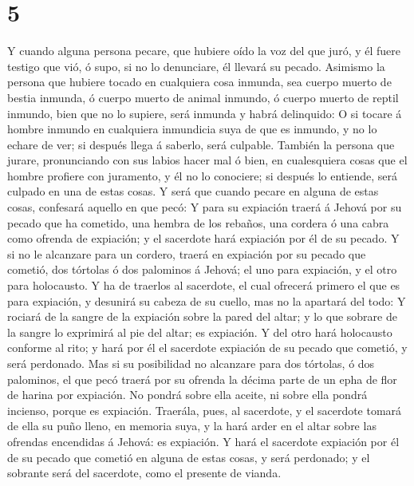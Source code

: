 \hypertarget{section-4}{%
\section{5}\label{section-4}}

 Y cuando alguna persona pecare, que hubiere oído la voz del
que juró, y él fuere testigo que vió, ó supo, si no lo denunciare, él
llevará su pecado.  Asimismo la persona que hubiere tocado
en cualquiera cosa inmunda, sea cuerpo muerto de bestia inmunda, ó
cuerpo muerto de animal inmundo, ó cuerpo muerto de reptil inmundo, bien
que no lo supiere, será inmunda y habrá delinquido:  O si
tocare á hombre inmundo en cualquiera inmundicia suya de que es inmundo,
y no lo echare de ver; si después llega á saberlo, será culpable.
 También la persona que jurare, pronunciando con sus labios
hacer mal ó bien, en cualesquiera cosas que el hombre profiere con
juramento, y él no lo conociere; si después lo entiende, será culpado en
una de estas cosas.  Y será que cuando pecare en alguna de
estas cosas, confesará aquello en que pecó:  Y para su
expiación traerá á Jehová por su pecado que ha cometido, una hembra de
los rebaños, una cordera ó una cabra como ofrenda de expiación; y el
sacerdote hará expiación por él de su pecado.  Y si no le
alcanzare para un cordero, traerá en expiación por su pecado que
cometió, dos tórtolas ó dos palominos á Jehová; el uno para expiación, y
el otro para holocausto.  Y ha de traerlos al sacerdote, el
cual ofrecerá primero el que es para expiación, y desunirá su cabeza de
su cuello, mas no la apartará del todo:  Y rociará de la
sangre de la expiación sobre la pared del altar; y lo que sobrare de la
sangre lo exprimirá al pie del altar; es expiación.  Y del
otro hará holocausto conforme al rito; y hará por él el sacerdote
expiación de su pecado que cometió, y será perdonado.  Mas
si su posibilidad no alcanzare para dos tórtolas, ó dos palominos, el
que pecó traerá por su ofrenda la décima parte de un epha de flor de
harina por expiación. No pondrá sobre ella aceite, ni sobre ella pondrá
incienso, porque es expiación.  Traerála, pues, al
sacerdote, y el sacerdote tomará de ella su puño lleno, en memoria suya,
y la hará arder en el altar sobre las ofrendas encendidas á Jehová: es
expiación.  Y hará el sacerdote expiación por él de su
pecado que cometió en alguna de estas cosas, y será perdonado; y el
sobrante será del sacerdote, como el presente de vianda. 
